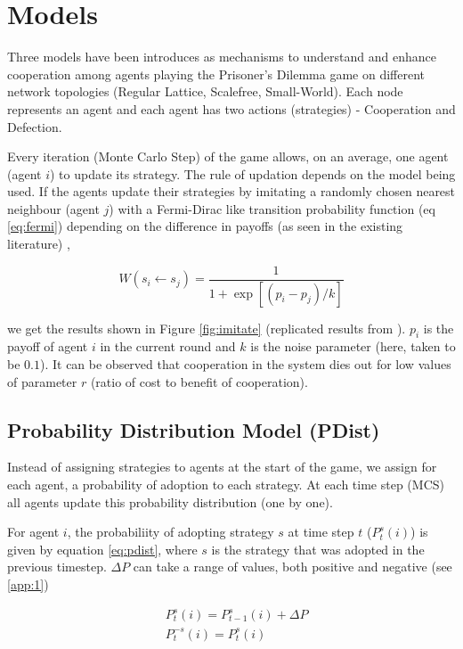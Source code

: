 \documentclass[11pt, A4 paper, twocolumn ]{article}
\begin{document}
	\section{Models} \label{sec:models}
		Three models have been introduces as mechanisms to understand and enhance 	cooperation among agents playing the Prisoner's Dilemma game on different network topologies (Regular Lattice, Scalefree, Small-World). Each node represents an agent and 	each agent has two actions (strategies) - Cooperation and Defection. \par 
		Every iteration (Monte Carlo Step) of the game allows, on an average, one agent (agent $i$) to update its strategy. The rule of updation depends on the model being used. If the agents update their strategies by imitating a randomly chosen nearest neighbour (agent $j$) with a Fermi-Dirac like transition probability function (eq \ref{eq:fermi}) depending on the difference in payoffs (as seen in the existing literature) \cite{review}, 
	
		\begin{equation} \label{eq:fermi}
			W(s_{i} \leftarrow s_{j}) = \frac{1}{1 + \exp[(p_{i} - p_{j})/k]}
		\end{equation}

	 	we get the results shown in Figure \ref{fig:imitate} (replicated results from \cite{gametheoryandphysics}). $p_{i}$ is the payoff of agent $i$ in the current round and $k$ is the noise parameter (here, taken to be $ 0.1 $).  It can be observed that cooperation in the system dies out for low values of parameter $r$ (ratio of cost to benefit of cooperation). 
	
		\subsection{Probability Distribution Model (PDist)} 
			Instead of assigning strategies to agents at the start of the game, we assign for each agent, a probability of adoption to each strategy. At each time step (MCS) all agents update this probability distribution (one by one). \par 
			For agent $i$, the probabiliity of adopting strategy $s$ at time step $t$ ($P_{t}^{s}(i)$) is 	given by equation \ref{eq:pdist}, where $s$ is the strategy that was adopted in the previous timestep. $ \Delta P $ can take a range of values, both positive and negative (see \ref{app:1}) 
			
			\begin{equation}\label{eq:pdist}
				\begin{split}
					&P_{t}^{s}(i) = P_{t-1}^{s}(i) + \Delta P 	\\
					&P_{t}^{-s}(i) = P_{t}^{s}(i) \\
				\end{split}
			\end{equation}
\end{document}
